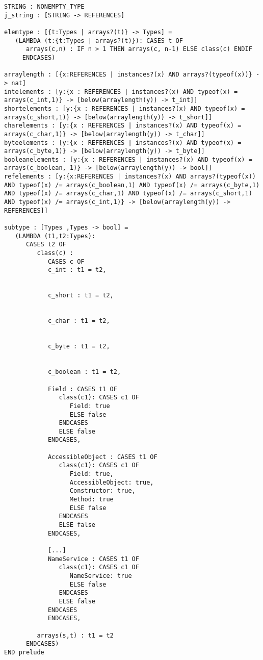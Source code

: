 \begin{verbatim}
STRING : NONEMPTY_TYPE
j_string : [STRING -> REFERENCES]

elemtype : [{t:Types | arrays?(t)} -> Types] =
   (LAMBDA (t:{t:Types | arrays?(t)}): CASES t OF
      arrays(c,n) : IF n > 1 THEN arrays(c, n-1) ELSE class(c) ENDIF
     ENDCASES)

arraylength : [{x:REFERENCES | instances?(x) AND arrays?(typeof(x))} -> nat]
intelements : [y:{x : REFERENCES | instances?(x) AND typeof(x) = arrays(c_int,1)} -> [below(arraylength(y)) -> t_int]]
shortelements : [y:{x : REFERENCES | instances?(x) AND typeof(x) = arrays(c_short,1)} -> [below(arraylength(y)) -> t_short]]
charelements : [y:{x : REFERENCES | instances?(x) AND typeof(x) = arrays(c_char,1)} -> [below(arraylength(y)) -> t_char]]
byteelements : [y:{x : REFERENCES | instances?(x) AND typeof(x) = arrays(c_byte,1)} -> [below(arraylength(y)) -> t_byte]]
booleanelements : [y:{x : REFERENCES | instances?(x) AND typeof(x) = arrays(c_boolean, 1)} -> [below(arraylength(y)) -> bool]]
refelements : [y:{x:REFERENCES | instances?(x) AND arrays?(typeof(x)) AND typeof(x) /= arrays(c_boolean,1) AND typeof(x) /= arrays(c_byte,1) AND typeof(x) /= arrays(c_char,1) AND typeof(x) /= arrays(c_short,1) AND typeof(x) /= arrays(c_int,1)} -> [below(arraylength(y)) -> REFERENCES]]

subtype : [Types ,Types -> bool] =
   (LAMBDA (t1,t2:Types):
      CASES t2 OF
         class(c) :
            CASES c OF
            c_int : t1 = t2,


            c_short : t1 = t2,


            c_char : t1 = t2,


            c_byte : t1 = t2,


            c_boolean : t1 = t2,

            Field : CASES t1 OF
               class(c1): CASES c1 OF
                  Field: true
                  ELSE false
               ENDCASES
               ELSE false
            ENDCASES,

            AccessibleObject : CASES t1 OF
               class(c1): CASES c1 OF
                  Field: true,
                  AccessibleObject: true,
                  Constructor: true,
                  Method: true
                  ELSE false
               ENDCASES
               ELSE false
            ENDCASES,

            [...]
            NameService : CASES t1 OF
               class(c1): CASES c1 OF
                  NameService: true
                  ELSE false
               ENDCASES
               ELSE false
            ENDCASES
            ENDCASES,

         arrays(s,t) : t1 = t2
      ENDCASES)
END prelude


 \end{verbatim}
